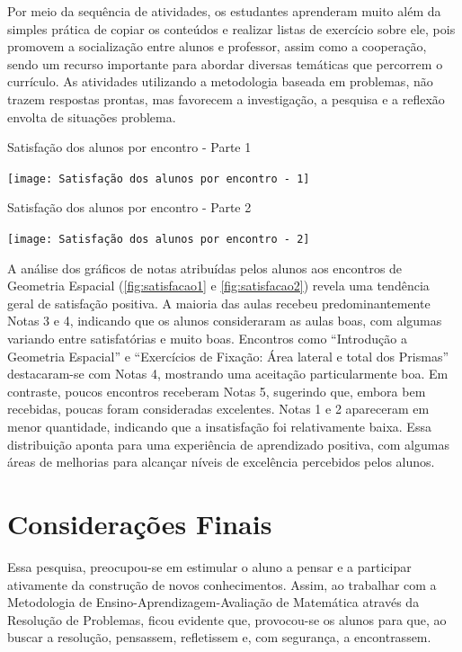 Por meio da sequência de atividades, os estudantes aprenderam muito além da simples prática de copiar os conteúdos e realizar listas de exercício sobre ele, pois promovem a socialização entre alunos e professor, assim como a cooperação, sendo um recurso importante para abordar diversas temáticas que percorrem o currículo. As atividades utilizando a metodologia baseada em problemas, não trazem respostas prontas, mas favorecem a investigação, a pesquisa e a reflexão envolta de situações problema.

\begin{CenteredFigure}
    \caption{Satisfação dos alunos por encontro - Parte 1} \label{fig:satisfacao1}
    \texttt{[image: Satisfação dos alunos por encontro - 1]}
    \legend{\autoria}
\end{CenteredFigure}

\begin{CenteredFigure}
    \caption{Satisfação dos alunos por encontro - Parte 2} \label{fig:satisfacao2}
    \texttt{[image: Satisfação dos alunos por encontro - 2]}
    \legend{\autoria}
\end{CenteredFigure}

A análise dos gráficos de notas atribuídas pelos alunos aos encontros de Geometria Espacial (\autoref{fig:satisfacao1} e \autoref{fig:satisfacao2}) revela uma tendência geral de satisfação positiva. A maioria das aulas recebeu predominantemente Notas 3 e 4, indicando que os alunos consideraram as aulas boas, com algumas variando entre satisfatórias e muito boas. Encontros como ``Introdução a Geometria Espacial'' e ``Exercícios de Fixação: Área lateral e total dos Prismas'' destacaram-se com Notas 4, mostrando uma aceitação particularmente boa. Em contraste, poucos encontros receberam Notas 5, sugerindo que, embora bem recebidas, poucas foram consideradas excelentes. Notas 1 e 2 apareceram em menor quantidade, indicando que a insatisfação foi relativamente baixa. Essa distribuição aponta para uma experiência de aprendizado positiva, com algumas áreas de melhorias para alcançar níveis de excelência percebidos pelos alunos.

\chapter{Considerações Finais} \label{cap:5_consideracoes}

Essa pesquisa, preocupou-se em estimular o aluno a pensar e a participar ativamente da construção de novos conhecimentos. Assim, ao trabalhar com a Metodologia de Ensino-Aprendizagem-Avaliação de Matemática através da Resolução de Problemas, ficou evidente que, provocou-se os alunos para que, ao buscar a resolução, pensassem, refletissem e, com segurança, a encontrassem.

